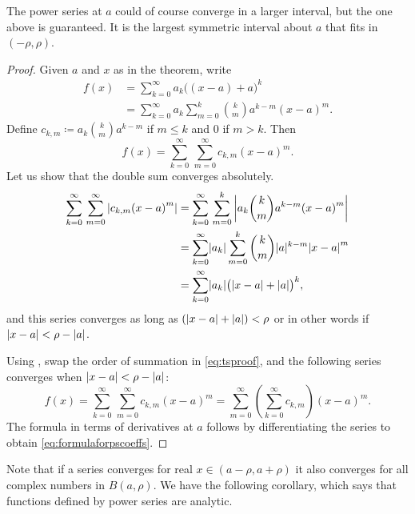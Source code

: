 The power series at $a$ could of course converge in a larger interval, but
the one above is guaranteed.  It is the largest symmetric interval about
$a$ that fits in $(-\rho,\rho)$.

\begin{proof}
Given $a$ and $x$ as in the theorem,
write
\begin{equation*}
\begin{split}
f(x) &= \sum_{k=0}^\infty a_k {\bigl((x-a)+a\bigr)}^k \\
&= \sum_{k=0}^\infty a_k \sum_{m=0}^k \binom{k}{m} a^{k-m} {(x-a)}^m .
\end{split}
\end{equation*}
Define $c_{k,m} \coloneqq a_k \binom{k}{m} a^{k-m}$ if $m \leq k$ and $0$ if $m >
k$.  Then 
\begin{equation} \label{eq:tsproof}
f(x) = \sum_{k=0}^\infty \, \sum_{m=0}^\infty c_{k,m} {(x-a)}^m .
\end{equation}
Let us show that the double sum converges absolutely.
\begin{equation*}
\begin{split}
\sum_{k=0}^\infty \, \sum_{m=0}^\infty \left\lvert { c_{k,m} {(x-a)}^m} \right\rvert
& = \sum_{k=0}^\infty \, \sum_{m=0}^k \left\lvert { a_k \binom{k}{m} a^{k-m} {(x-a)}^m } \right\rvert
\\
& = \sum_{k=0}^\infty \lvert {a_k} \rvert \sum_{m=0}^k \binom{k}{m} \lvert {a} \rvert^{k-m}
{\lvert {x-a} \rvert}^m  \\
& = \sum_{k=0}^\infty \lvert {a_k} \rvert {\bigl(\lvert {x-a} \rvert+\lvert {a} \rvert\bigr)}^k ,
\end{split}
\end{equation*}
and this series converges as long as 
$(\lvert {x-a} \rvert+\lvert {a} \rvert) < \rho$ or in other words if
$\lvert {x-a} \rvert < \rho-\lvert {a} \rvert$.

Using ,
swap the order of summation in \eqref{eq:tsproof}, and 
the following series converges when $\lvert {x-a} \rvert < \rho-\lvert {a} \rvert$:
\begin{equation*}
f(x) =
\sum_{k=0}^\infty \, \sum_{m=0}^\infty c_{k,m} {(x-a)}^m
=
\sum_{m=0}^\infty
\left( \sum_{k=0}^\infty
c_{k,m} \right) {(x-a)}^m .
\end{equation*}
The formula in terms of derivatives at $a$ follows by
differentiating the series to obtain \eqref{eq:formulaforpscoeffs}.
\end{proof}

Note that if a series converges for real $x \in (a-\rho,a+\rho)$ it also converges
for all complex numbers in $B(a,\rho)$.
We have the following corollary, which says that functions defined
by power series are analytic.

